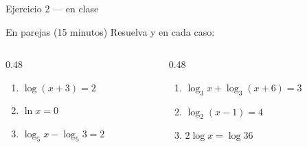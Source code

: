 \documentclass[aspectratio=169,10pt]{beamer}
\begin{document}
\begin{frame}{Ejercicio 2 — en clase}
  \begin{alertblock}{En parejas (15 minutos)}
    \scriptsize
    Resuelva y  en cada caso:

    \vspace{0.25cm}
    \begin{columns}[T,onlytextwidth]
      \begin{column}{0.48\textwidth}
        \begin{enumerate}\setlength{\itemsep}{0.16cm}
          \item $\log(x+3) = 2$
          \item $\ln x = 0$
          \item $\log_{5}x - \log_{5}3 = 2$
        \end{enumerate}
      \end{column}
      \begin{column}{0.48\textwidth}
        \begin{enumerate}\setlength{\itemsep}{0.16cm}
          \setcounter{enumi}{3}
          \item $\log_{3}x + \log_{3}(x+6) = 3$
          \item $\log_{2}(x-1) = 4$
          \item $2\log x = \log 36$
        \end{enumerate}
      \end{column}
    \end{columns}
  \end{alertblock}
\end{frame}
\end{document}
